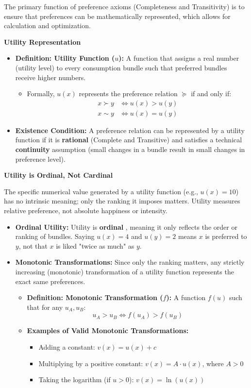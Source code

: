 \documentclass{article}
\begin{document}
The primary function of preference axioms (Completeness and Transitivity) is to ensure that preferences can be mathematically represented, which allows for calculation and optimization.

\textbf{Utility Representation}
\begin{itemize}
    \item \textbf{Definition: Utility Function ($u$):} A function that assigns a real number (utility level) to every consumption bundle such that preferred bundles receive higher numbers.
    \begin{itemize}
        \item Formally, $u(x)$ represents the preference relation $\succeq$ if and only if: \begin{align*} x \succ y &\iff u(x) > u(y) \\ x \sim y &\iff u(x) = u(y) \end{align*}
    \end{itemize}
    \item \textbf{Existence Condition:} A preference relation can be represented by a utility function if it is \textbf{rational} (Complete and Transitive) and satisfies a technical \textbf{continuity} assumption (small changes in a bundle result in small changes in preference level).
\end{itemize}

\textbf{Utility is Ordinal, Not Cardinal}

The specific numerical value generated by a utility function (e.g., $u(x)=10$) has no intrinsic meaning; only the ranking it imposes matters. Utility measures relative preference, not absolute happiness or intensity.

\begin{itemize}
    \item \textbf{Ordinal Utility:} Utility is \textbf{ordinal} , meaning it only reflects the order or ranking of bundles. Saying $u(x)=4$ and $u(y)=2$ means $x$ is preferred to $y$, not that $x$ is liked "twice as much" as $y$.
    \item \textbf{Monotonic Transformations:} Since only the ranking matters, any strictly increasing (monotonic) transformation of a utility function represents the exact same preferences.
    \begin{itemize}
        \item \textbf{Definition: Monotonic Transformation ($f$):} A function $f(u)$ such that for any $u_A, u_B$: \[u_A > u_B \iff f(u_A) > f(u_B)\]
        \item \textbf{Examples of Valid Monotonic Transformations:}
        \begin{itemize}
            \item Adding a constant: $v(x) = u(x) + c$
            \item Multiplying by a positive constant: $v(x) = A \cdot u(x)$, where $A > 0$
            \item Taking the logarithm (if $u > 0$): $v(x) = \ln(u(x))$
        \end{itemize}
    \end{itemize}
\end{itemize}
\end{document}
